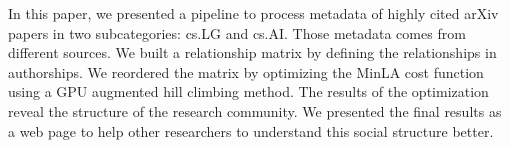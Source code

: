 In this paper, we presented a pipeline to process metadata of highly cited arXiv papers in two subcategories: cs.LG and cs.AI.
Those metadata comes from different sources.
We built a relationship matrix by defining the relationships in authorships.
We reordered the matrix by optimizing the MinLA cost function using a GPU augmented hill climbing method.
The results of the optimization reveal the structure of the research community.
We presented the final results as a web page to help other researchers to understand this social structure better.
